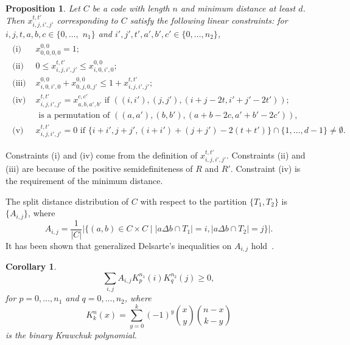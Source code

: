 \documentclass[final,onecolumn]{IEEEtran}
\newtheorem{corollaryenv}[definitionenv]{Corollary}
\newtheorem{propositionenv}[definitionenv]{Proposition}
\newenvironment{corollary}{\begin{corollaryenv}\rm}{\end{corollaryenv}}
\newenvironment{proposition}{\begin{propositionenv}\rm}{\end{propositionenv}}
\theoremstyle{definition}
\begin{document}
	
\begin{proposition}
	\label{pro:lin}
	Let $C$ be a code with length $n$ and minimum distance at least $d$. Then 
	$x_{i,j,i',j'}^{t,t'}$	corresponding to $C$ satisfy the following linear constraints: for $i, j, t, a, b, c \in \{0, \dots,$ $n_{1}\}$ and $i', j', t', a', b', c' \in \{0, \dots, n_{2}\}$,
	\begin{align}
	    \begin{array}{cl}
		    \mbox{(i) }& x_{0, 0, 0, 0}^{0, 0} = 1; \\
			\mbox{(ii) }& 0 \leq x_{i, j, i', j'}^{t, t'} \leq x_{i, 0, i', 0}^{0, 0};  \\
			\mbox{(iii) }& x_{i, 0, i', 0}^{0, 0} + x_{0, j, 0, j'}^{0, 0} \leq 1 + x_{i, j, i', j'}^{t, t'}; \\
			\mbox{(iv) }& x_{i, j, i', j'}^{t, t'} = x_{a, b, a', b'}^{c, c'} \mbox{ if } ((i, i'), (j, j'), (i+j-2t, i'+j'-2t'));  \\
			&\mbox{ is a permutation of } ((a, a'), (b, b'), (a+b-2c, a'+b'-2c')),  \\
			\mbox{(v) }&  x_{i, j, i', j'}^{t, t'} = 0 \mbox{ if } \{i+i', j+j', (i+i')+(j+j')-2(t+t')\} \cap \{1, \dots, d-1\} \neq \emptyset. \label{eq:split_cons}
		\end{array}
	\end{align}
\end{proposition} 
	
	
Constraints (i) and (iv) come from the definition of $x_{i, j, i', j'}^{t, t'}$. Constraints (ii) and (iii) are because of the positive semidefiniteness of $R$ and $R'$. Constraint (iv) is the requirement of the minimum distance.
	
	
	
	
The split distance distribution of $C$ with respect to the partition $\{T_1,T_2\}$ is  $\{A_{i, j}\}$, where
\begin{equation*}
	A_{i, j} = \frac{1}{\lvert C \rvert} \lvert \{(a, b) \in C \times C \mid \lvert a \Delta b \cap T_{1}\rvert = i, \lvert a \Delta b \cap T_{2}\rvert = j\}\rvert.
\end{equation*}
It has been shown that generalized Delsarte's inequalities on $A_{i,j}$ hold~\cite{Sim95}.
\begin{corollary}\cite[Generalized Delsarte's inequalities]{Sim95}
	\label{coro:gen_del}
	\begin{equation}
		\sum_{i, j} A_{i, j} K_{p}^{n_{1}}(i) K_{q}^{n_{2}}(j) \geq 0, \label{eq:split_del}
	\end{equation}
	for $p = 0, \dots, n_{1}$ and $q = 0, \dots, n_{2}$, where
	\begin{equation*}
		K_{k}^{n}(x) = \sum_{y=0}^k (-1)^{y} \binom{x}{y} \binom{n-x}{k-y}
	\end{equation*}
	is the binary Krawchuk polynomial.
\end{corollary}
	
\end{document}
